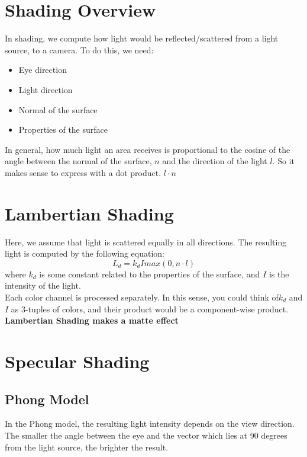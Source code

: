 \documentclass[12pt]{article}
\theoremstyle{definition}
\begin{document}
\section{Shading Overview}
In shading, we compute how light would be reflected/scattered from a light source, to a camera. To do this, we need:
\begin{itemize}
	\item Eye direction
	\item Light direction
	\item Normal of the surface
	\item Properties of the surface
\end{itemize}
In general, how much light an area receives is proportional to the cosine of the angle between the normal of the surface, $n$ and the direction of the light $l$. So it makes sense to express with a dot product. $l \cdot n$\\ \linebreak

\section{Lambertian Shading}
Here, we assume that light is scattered equally in all directions. The resulting light is computed by the following equation:
$$L_d = k_dImax(0, n\cdot l)$$
where $k_d$ is some constant related to the properties of the surface, and $I$ is the intensity of the light.
\\ \linebreak
Each color channel is processed separately. In this sense, you could think of$k_d$ and $I$ as 3-tuples of colors, and their product would be a component-wise product.
\\ \linebreak
\textbf{Lambertian Shading makes a matte effect}

\section{Specular Shading}
\subsection{Phong Model}
In the Phong model, the resulting light intensity depends on the view direction. The smaller the angle between the eye and the vector which lies at 90 degrees from the light source, the brighter the result.
\end{document}
